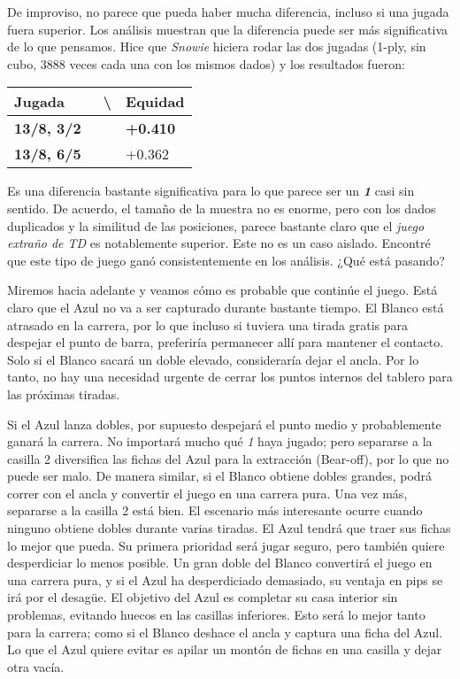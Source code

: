 \documentclass[
]{article}
\begin{document}
De improviso, no parece que pueda haber mucha diferencia, incluso si una
jugada fuera superior. Los análisis muestran que la diferencia puede ser
más significativa de lo que pensamos. Hice que \emph{Snowie} hiciera
rodar las dos jugadas (1-ply, sin cubo, 3888 veces cada una con los
mismos dados) y los resultados fueron:

\begin{longtable}[]{@{}lll@{}}
\toprule()
Jugada & ~\textbackslash{} & Equidad \\
\midrule()
\endhead
\textbf{13/8, 3/2} & & \textbf{+0.410} \\
\textbf{13/8, 6/5} & & +0.362 \\
\bottomrule()
\end{longtable}

Es una diferencia bastante significativa para lo que parece ser un
\textbf{\emph{1}} casi sin sentido. De acuerdo, el tamaño de la muestra
no es enorme, pero con los dados duplicados y la similitud de las
posiciones, parece bastante claro que el \emph{juego extraño de TD} es
notablemente superior. Este no es un caso aislado. Encontré que este
tipo de juego ganó consistentemente en los análisis. ¿Qué está pasando?

Miremos hacia adelante y veamos cómo es probable que continúe el juego.
Está claro que el Azul no va a ser capturado durante bastante tiempo. El
Blanco está atrasado en la carrera, por lo que incluso si tuviera una
tirada gratis para despejar el punto de barra, preferiría permanecer
allí para mantener el contacto. Solo si el Blanco sacará un doble
elevado, consideraría dejar el ancla. Por lo tanto, no hay una necesidad
urgente de cerrar los puntos internos del tablero para las próximas
tiradas.

Si el Azul lanza dobles, por supuesto despejará el punto medio y
probablemente ganará la carrera. No importará mucho qué \emph{1} haya
jugado; pero separarse a la casilla 2 diversifica las fichas del Azul
para la extracción (Bear-off), por lo que no puede ser malo. De manera
similar, si el Blanco obtiene dobles grandes, podrá correr con el ancla
y convertir el juego en una carrera pura. Una vez más, separarse a la
casilla 2 está bien. El escenario más interesante ocurre cuando ninguno
obtiene dobles durante varias tiradas. El Azul tendrá que traer sus
fichas lo mejor que pueda. Su primera prioridad será jugar seguro, pero
también quiere desperdiciar lo menos posible. Un gran doble del Blanco
convertirá el juego en una carrera pura, y si el Azul ha desperdiciado
demasiado, su ventaja en pips se irá por el desagüe. El objetivo del
Azul es completar su casa interior sin problemas, evitando huecos en las
casillas inferiores. Esto será lo mejor tanto para la carrera; como si
el Blanco deshace el ancla y captura una ficha del Azul. Lo que el Azul
quiere evitar es apilar un montón de fichas en una casilla y dejar otra
vacía.
\end{document}
